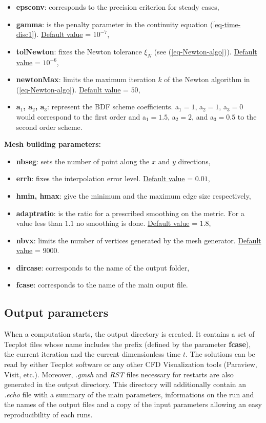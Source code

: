 \begin{itemize}
   \item {\bf epsconv}: corresponds to the precision criterion for steady cases,
   \item {\bf gamma}: is the penalty parameter in the continuity equation (\ref{eq-time-disc1}). \underline{Default value} = $10^{-7}$,
   \item {\bf tolNewton}: fixes the Newton tolerance $\xi_N$ (see (\ref{eq-Newton-algo})). \underline{Default value} = $10^{-6}$,
   \item {\bf newtonMax}: limits the maximum iteration $k$ of the Newton algorithm in (\ref{eq-Newton-algo}). \underline{Default value} = $50$,
   \item {\bf a$_1$, a$_2$, a$_3$}: represent the BDF scheme coefficients. a$_1 =1$, a$_2 = 1$, a$_3 = 0$ would correspond to the first order and a$_1 =1.5$, a$_2 = 2$, and a$_3 = 0.5$ to the second order scheme.
\end{itemize}
{\bf Mesh building parameters:}
\begin{itemize}
   \item {\bf nbseg}: sets the number of point along the $x$ and $y$ directions,
   \item {\bf errh}: fixes the interpolation error level. \underline{Default value} = $0.01$,
   \item {\bf hmin, hmax}: give the minimum and the maximum edge size respectively,
   \item {\bf adaptratio}: is the ratio for a prescribed smoothing on the metric. For a value less than $1.1$ no smoothing is done. \underline{Default value} = $1.8$,
   \item {\bf nbvx}: limits the number of vertices generated by the mesh generator. \underline{Default value} = $9000$.
\end{itemize}

   \begin{itemize}
      \item {\bf dircase}: corresponds to the name of the output folder,
      \item {\bf fcase}: corresponds to the name of the main ouput file.
   \end{itemize}

\subsection{Output parameters}
When a computation starts, the output directory is created.
It contains a set of Tecplot files whose name includes the prefix (defined by the parameter {\bf fcase}), the current iteration and the current dimensionless time $t$. 
The solutions can be read by either Tecplot software or any other CFD Visualization tools (Paraview, Visit, etc.).
Moreover, {\em .gmsh}  and {\em RST} files necessary for restarts are also generated in the output directory.
This directory will additionally contain an {\em .echo} file with a summary of the main parameters, informations on the run and the names of the output files and a copy of the input parameters allowing an easy reproducibility of each runs.


